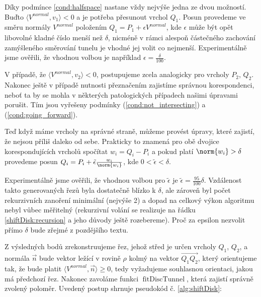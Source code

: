 Díky podmínce \ref{cond:halfspace} nastane vždy nejvýše jedna
ze dvou možností. Buďto \break $ {\langle V^{normal}, v_1\rangle < 0 }$ a je potřeba
přesunout vrchol $ Q_1 $. Posun provedeme ve směru normály $ V^{normal} $ položením
$ Q_1 = P_1 + \epsilon V^{normal} $, kde $ \epsilon $ může být opět libovolné
kladné číslo menší než $ \delta $, nicméně v rámci alespoň částečného zachování
zamýšleného směrování tunelu je vhodné jej volit co nejmenší. Experimentálně
jsme ověřili, že vhodnou volbou je například $ \epsilon = \frac{\delta}{100} $.

V případě, že $ \langle V^{normal}, v_2\rangle < 0 $, postupujeme zcela analogicky
pro vrcholy $ P_2 $, $ Q_2 $. Nakonec ještě v případě nutnosti přeznačením
zajistíme správnou korespondenci, neboť ta by se mohla v některých patologických
případech našimi úpravami porušit. Tím jsou vyřešeny podmínky
(\ref{cond:not_intersecting}) a (\ref{cond:going_forward}).

Teď když máme vrcholy na správné straně, můžeme provést úpravy, které zajistí,
že nejsou příliš daleko od sebe. Prakticky to znamená pro obě dvojice
korespondujících vrcholů spočítat $ w_i = Q_i - P_i $ a pokud platí
$ \norm{w_i} > \delta $ provedeme posun
$ Q_i = P_i + \tilde{\epsilon} \frac{w_i}{\norm{w_i}} $, kde
$ 0 < \tilde{\epsilon} < \delta $.

Experimentálně jsme ověřili, že vhodnou volbou pro $ \tilde{\epsilon} $ je
$ \tilde{\epsilon} = \frac{95}{100} \delta$. Vzdálenost takto generovaných řezů
byla dostatečně blízko k $ \delta $, ale zároveň byl počet rekurzivních zanoření
minimální (nejvýše 2) a dopad na celkový výkon algoritmu nebyl vůbec měřitelný
(rekurzivní volání se realizuje na řádku \ref{shiftDisk:recursion} a jeho důvody
ještě rozebereme). Proč za epsilon nezvolit přímo $ \delta $ bude zřejmé z
pozdějšího textu.

Z výsledných bodů zrekonstruujeme řez, jehož střed je určen vrcholy
$ Q_1 $, $ Q_2 $, a normála $ \vec{n} $ bude vektor ležící v rovině $ \rho $
kolmý na vektor $ \overrightarrow{Q_1 Q_2} $, který orientujeme tak, že bude platit
$ \langle V^{normal}, \vec{n} \rangle \geq 0 $, tedy vyžadujeme souhlasnou
orientaci, jakou má předchozí řez. Nakonec zavoláme funkci
$ \operatorname{fitDiscTunnel} $, která zajistí správně zvolený poloměr.
Uvedený postup shrnuje pseudokód č. \ref{alg:shiftDisk}:


